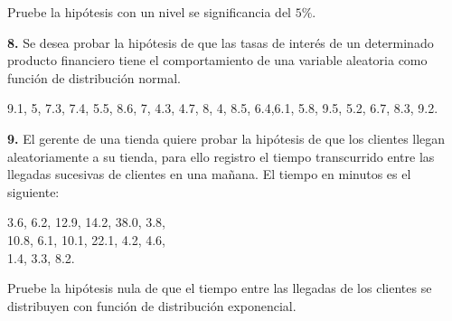 \documentclass[
  a4paper,
  oneside,
  openany]{book}
\begin{document}
Pruebe la hipótesis con un nivel se significancia del \(5\%\).

\textbf{8.} Se desea probar la hipótesis de que las tasas de interés de un determinado producto financiero tiene el comportamiento de una variable aleatoria como función de distribución normal.

9.1, 5, 7.3, 7.4, 5.5, 8.6, 7, 4.3, 4.7, 8,
4, 8.5, 6.4,6.1, 5.8, 9.5, 5.2, 6.7, 8.3, 9.2.

\textbf{9.} El gerente de una tienda quiere probar la hipótesis de que los clientes llegan aleatoriamente a su tienda, para ello registro el tiempo transcurrido entre las llegadas sucesivas de clientes en una mañana. El tiempo en minutos es el siguiente:

3.6, 6.2, 12.9, 14.2, 38.0, 3.8,\\
10.8, 6.1, 10.1, 22.1, 4.2, 4.6,\\
1.4, 3.3, 8.2.

Pruebe la hipótesis nula de que el tiempo entre las llegadas de los clientes se distribuyen con función de distribución exponencial.

  
\end{document}
